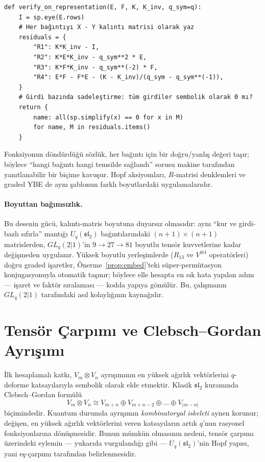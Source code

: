 \documentclass[10pt]{math}
\numberwithin{equation}{section}
\theoremstyle{plain}
\theoremstyle{definition}
\renewcommand{\sl}{\mathfrak{sl}}
\newcommand{\Uq}{U_q(\sl_2)}
\begin{document}
\begin{lstlisting}[style=pyblock,caption={Tanımlayıcı bağıntıların sıfır-kalıntı yöntemiyle doğrulanması}]
def verify_on_representation(E, F, K, K_inv, q_sym=q):
    I = sp.eye(E.rows)
    # Her bağıntıyı X - Y kalıntı matrisi olarak yaz
    residuals = {
        "R1": K*K_inv - I,
        "R2": K*E*K_inv - q_sym**2 * E,
        "R3": K*F*K_inv - q_sym**(-2) * F,
        "R4": E*F - F*E - (K - K_inv)/(q_sym - q_sym**(-1)),
    }
    # Girdi bazında sadeleştirme: tüm girdiler sembolik olarak 0 mı?
    return {
        name: all(sp.simplify(x) == 0 for x in M)
        for name, M in residuals.items()
    }
\end{lstlisting}

Fonksiyonun döndürdüğü sözlük, her bağıntı için bir doğru/yanlış değeri taşır;
böylece ``hangi bağıntı hangi temsilde sağlandı'' sorusu makine tarafından
yanıtlanabilir bir biçime kavuşur. Hopf aksiyomları, $R$-matrisi denklemleri ve
graded YBE de aynı şablonun farklı boyutlardaki uygulamalarıdır.

\paragraph{Boyuttan bağımsızlık.} Bu desenin gücü, kalıntı-matris boyutuna
duyarsız olmasıdır: aynı ``kur ve girdi-bazlı sıfırla'' mantığı $\Uq$
bağıntılarındaki $(n{+}1)\times(n{+}1)$ matrislerden, $GL_q(2|1)$'in
$9\to 27\to 81$ boyutlu tensör kuvvetlerine kadar değişmeden uygulanır. Yüksek
boyutlu yerleşimlerde ($R_{13}$ ve $V^{\otimes 4}$ operatörleri) doğru graded
işaretler, Önerme~\ref{prop:embed}'teki süper-permütasyon konjugasyonuyla
otomatik taşınır; böylece elle hesapta en sık hata yapılan adım --- işaret ve
faktör sıralaması --- kodda yapıya gömülür. Bu, çalışmanın $GL_q(2|1)$
tarafındaki asıl kolaylığının kaynağıdır.

\section{Tensör Çarpımı ve Clebsch--Gordan Ayrışımı}

İlk hesaplamalı katkı, $V_m \otimes V_n$ ayrışımının en yüksek ağırlık
vektörlerini $q$-deforme katsayılarıyla sembolik olarak elde etmektir. Klasik
$\sl_2$ kuramında Clebsch--Gordan formülü
\[
  V_m \otimes V_n \cong V_{m+n} \oplus V_{m+n-2} \oplus \dots \oplus V_{|m-n|}
\]
biçimindedir. Kuantum durumda ayrışımın \emph{kombinatoryal iskeleti} aynen
korunur; değişen, en yüksek ağırlık vektörlerini veren katsayıların artık
$q$'nun rasyonel fonksiyonlarına dönüşmesidir. Bunun mümkün olmasının nedeni,
tensör çarpımı üzerindeki eylemin --- yukarıda vurgulandığı gibi --- $\Uq$'nin
Hopf yapısı, yani eş-çarpımı tarafından belirlenmesidir.
\end{document}
